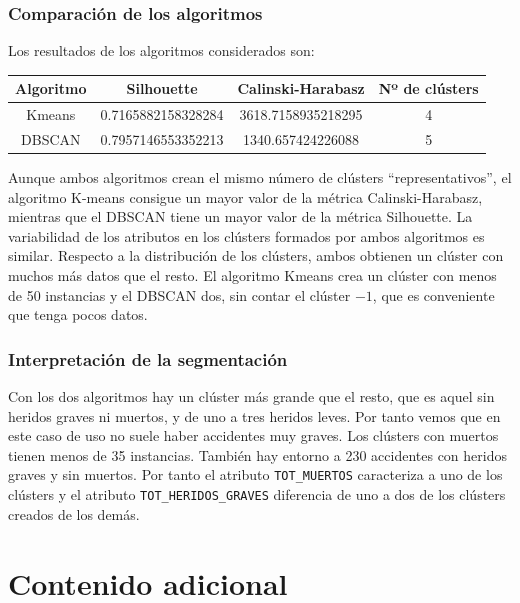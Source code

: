 \documentclass[a4]{article}
\begin{document}
\subsubsection{Comparación de los algoritmos}

Los resultados de los algoritmos considerados son:

\begin{center}
\begin{tabular}{|c|c|c|c|}
\hline
  \multicolumn{1}{|c|}{\textbf{Algoritmo}} & \textbf{Silhouette} & \textbf{Calinski-Harabasz} &  \textbf{Nº de clústers}\\ \hline
 Kmeans & 0.7165882158328284 & 3618.7158935218295 & 4 \\ \hline
 DBSCAN & 0.7957146553352213 & 1340.657424226088  & 5 \\ \hline
\end{tabular}
\end{center}

Aunque ambos algoritmos crean el mismo número de clústers ``representativos'', el algoritmo K-means consigue un mayor valor de la métrica Calinski-Harabasz, mientras que el DBSCAN tiene un mayor valor de la métrica Silhouette. La variabilidad de los atributos en los clústers formados por ambos algoritmos es similar. Respecto a la distribución de los clústers, ambos obtienen un clúster con muchos más datos que el resto. El algoritmo Kmeans crea un clúster con menos de 50 instancias y el DBSCAN dos, sin contar el clúster $-1$, que es conveniente que tenga pocos datos.

\subsubsection{Interpretación de la segmentación}

Con los dos algoritmos hay un clúster más grande que el resto, que es aquel sin heridos graves ni muertos, y de uno a tres heridos leves. Por tanto vemos que en este caso de uso no suele haber accidentes muy graves. Los clústers con muertos tienen menos de 35 instancias. También hay entorno a 230 accidentes con heridos graves y sin muertos. Por tanto el atributo \texttt{TOT\_MUERTOS} caracteriza a uno de los clústers y el atributo \texttt{TOT\_HERIDOS\_GRAVES} diferencia de uno a dos de los clústers creados de los demás. 

\newpage
\section{Contenido adicional}
\end{document}
